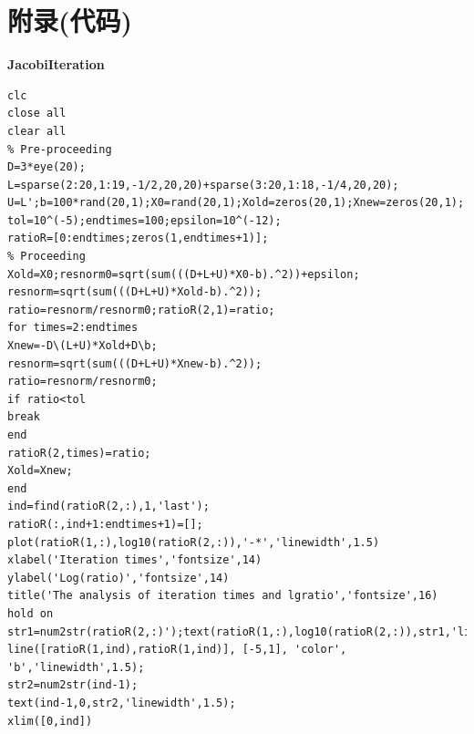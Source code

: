 \documentclass[a4paper,11pt,UTF8]{article}%
\theoremstyle{plain}
\begin{document}
	\clearpage
	\section{附录(代码)}
	\noindent \textbf{JacobiIteration}
	\lstset{language=Matlab}%
	\lstset{breaklines}%
	\lstset{extendedchars=false}%
	\begin{lstlisting}
clc
close all
clear all
% Pre-proceeding
D=3*eye(20);
L=sparse(2:20,1:19,-1/2,20,20)+sparse(3:20,1:18,-1/4,20,20);
U=L';b=100*rand(20,1);X0=rand(20,1);Xold=zeros(20,1);Xnew=zeros(20,1);
tol=10^(-5);endtimes=100;epsilon=10^(-12);
ratioR=[0:endtimes;zeros(1,endtimes+1)];
% Proceeding
Xold=X0;resnorm0=sqrt(sum(((D+L+U)*X0-b).^2))+epsilon;
resnorm=sqrt(sum(((D+L+U)*Xold-b).^2));
ratio=resnorm/resnorm0;ratioR(2,1)=ratio;
for times=2:endtimes
Xnew=-D\(L+U)*Xold+D\b;
resnorm=sqrt(sum(((D+L+U)*Xnew-b).^2));
ratio=resnorm/resnorm0;
if ratio<tol
break
end
ratioR(2,times)=ratio;
Xold=Xnew;
end
ind=find(ratioR(2,:),1,'last');
ratioR(:,ind+1:endtimes+1)=[];
plot(ratioR(1,:),log10(ratioR(2,:)),'-*','linewidth',1.5)
xlabel('Iteration times','fontsize',14)
ylabel('Log(ratio)','fontsize',14)
title('The analysis of iteration times and lgratio','fontsize',16)
hold on
str1=num2str(ratioR(2,:)');text(ratioR(1,:),log10(ratioR(2,:)),str1,'linewidth',1.5);
line([ratioR(1,ind),ratioR(1,ind)], [-5,1], 'color', 'b','linewidth',1.5);
str2=num2str(ind-1);
text(ind-1,0,str2,'linewidth',1.5);
xlim([0,ind])
	\end{lstlisting}
\end{document}
